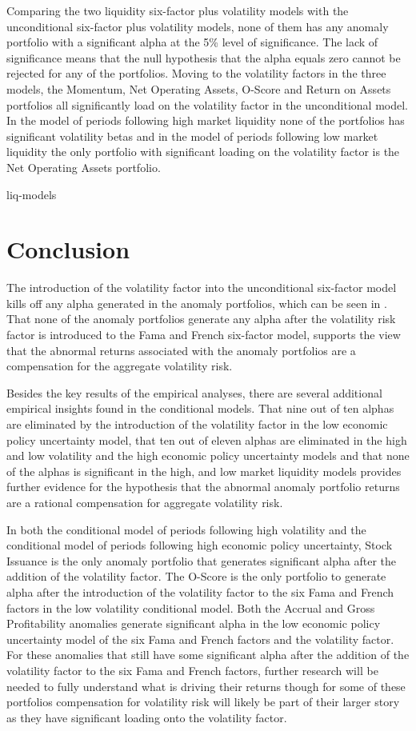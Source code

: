 \documentclass[12pt, a4paper, oneside]{article}
\newcommand{\hypref}[1]{\hyperref[#1]{\Cref*{#1}}}
\begin{document}
Comparing the two liquidity six-factor plus volatility models with the unconditional six-factor plus volatility models, none of them has any anomaly portfolio with a significant alpha at the 5\% level of significance. The lack of significance means that the null hypothesis that the alpha equals zero cannot be rejected for any of the portfolios. Moving to the volatility factors in the three models, the Momentum, Net Operating Assets, O-Score and Return on Assets portfolios all significantly load on the volatility factor in the unconditional model. In the model of periods following high market liquidity none of the portfolios has significant volatility betas and in the model of periods following low market liquidity the only portfolio with significant loading on the volatility factor is the Net Operating Assets portfolio. 

{liq-models}

\section{Conclusion}\label{sec:conclusion}
The introduction of the volatility factor into the unconditional six-factor model kills off any alpha generated in the anomaly portfolios, which can be seen in \hypref{tab:ff6v}. That none of the anomaly portfolios generate any alpha after the volatility risk factor is introduced to the Fama and French six-factor model, supports the view that the abnormal returns associated with the anomaly portfolios are a compensation for the aggregate volatility risk. 

Besides the key results of the empirical analyses, there are several additional empirical insights found in the conditional models. That nine out of ten alphas are eliminated by the introduction of the volatility factor in the low economic policy uncertainty model, that ten out of eleven alphas are eliminated in the high and low volatility and the high economic policy uncertainty models and that none of the alphas is significant in the high, and low market liquidity models provides further evidence for the hypothesis that the abnormal anomaly portfolio returns are a rational compensation for aggregate volatility risk.

In both the conditional model of periods following high volatility and the conditional model of periods following high economic policy uncertainty, Stock Issuance is the only anomaly portfolio that generates significant alpha after the addition of the volatility factor. The O-Score is the only portfolio to generate alpha after the introduction of the volatility factor to the six Fama and French factors in the low volatility conditional model. Both the Accrual and Gross Profitability anomalies generate significant alpha in the low economic policy uncertainty model of the six Fama and French factors and the volatility factor. For these anomalies that still have some significant alpha after the addition of the volatility factor to the six Fama and French factors, further research will be needed to fully understand what is driving their returns though for some of these portfolios compensation for volatility risk will likely be part of their larger story as they have significant loading onto the volatility factor.
\end{document}
